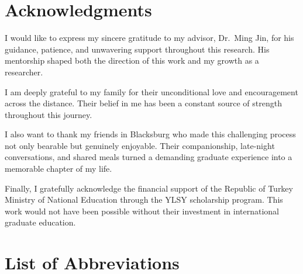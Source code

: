 \documentclass[12pt, letterpaper]{report}
\begin{document}
\chapter*{Acknowledgments}

I would like to express my sincere gratitude to my advisor, Dr.\ Ming Jin, for his guidance, patience, and unwavering support throughout this research. His mentorship shaped both the direction of this work and my growth as a researcher.

I am deeply grateful to my family for their unconditional love and encouragement across the distance. Their belief in me has been a constant source of strength throughout this journey.

I also want to thank my friends in Blacksburg who made this challenging process not only bearable but genuinely enjoyable. Their companionship, late-night conversations, and shared meals turned a demanding graduate experience into a memorable chapter of my life.

Finally, I gratefully acknowledge the financial support of the Republic of Turkey Ministry of National Education through the YLSY scholarship program. This work would not have been possible without their investment in international graduate education.

\tableofcontents
\listoffigures
\listoftables

\chapter*{List of Abbreviations}
\end{document}

